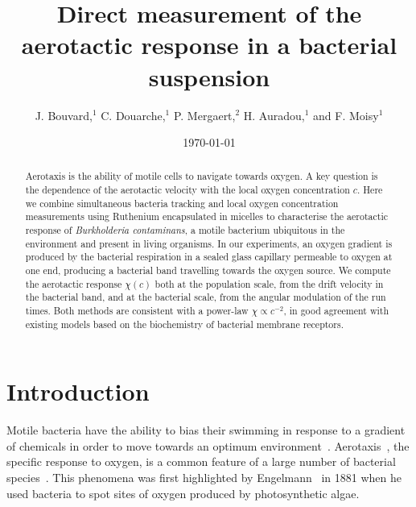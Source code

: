 \documentclass[aps,a4paper,twocolumn,10pt,pre,showpacs]{revtex4-2}
\begin{document}
\title{Direct measurement of the aerotactic response in a bacterial suspension}

\author{J. Bouvard,$^1$  C. Douarche,$^1$ P. Mergaert,$^2$ H. Auradou,$^1$ and F. Moisy$^1$}

\date{\today}

\begin{abstract}
Aerotaxis is the ability of motile cells to navigate towards oxygen. A key question is the dependence of the aerotactic velocity with the local oxygen concentration $c$. Here we combine simultaneous bacteria tracking and local oxygen concentration measurements using Ruthenium encapsulated in micelles to characterise the aerotactic response of \emph{Burkholderia contaminans}, a motile bacterium ubiquitous in the environment and present in living organisms.  In our experiments, an oxygen gradient is produced by the bacterial respiration in a sealed glass capillary permeable to oxygen at one end, producing a bacterial band travelling towards the oxygen source. We compute the aerotactic response $\chi(c)$ both at the population scale, from the drift velocity in the bacterial band, and at the bacterial scale, from the angular modulation of the run times. Both methods are consistent with a power-law $\chi \propto c^{-2}$, in good agreement with existing models based on the biochemistry of bacterial membrane receptors.
\end{abstract}

\maketitle


\section{Introduction}

Motile bacteria have the ability to bias their swimming in response to a gradient of chemicals in order to move towards an optimum environment~\cite{Taylor1999}. Aerotaxis~\cite{engelmann1881,Baracchini1959}, the specific response to oxygen, is a common feature of a large number of bacterial species~\cite{menolascina2017logarithmic,Adler2012,morse2016,Taylor1983,Stricker2020,Frankel1997,popp2014polarity,Fischer2006,mazzag2003model}. %
This phenomena was first highlighted by Engelmann~\cite{engelmann1881} in 1881 when he used bacteria to spot sites of oxygen produced by photosynthetic algae.
\end{document}
